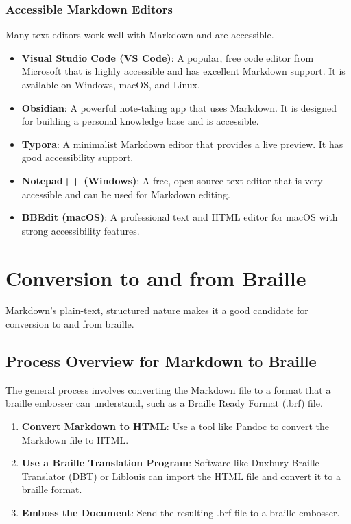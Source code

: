 \subsubsection{Accessible Markdown Editors}
\label{ssubsec:accessible-markdown-editors-details}
Many text editors work well with Markdown and are accessible.
\begin{itemize}
	\item \textbf{Visual Studio Code (VS Code)}: A popular, free code editor from Microsoft that is highly accessible and has excellent Markdown support. It is available on Windows, macOS, and Linux.
	\item \textbf{Obsidian}: A powerful note-taking app that uses Markdown. It is designed for building a personal knowledge base and is accessible.
	\item \textbf{Typora}: A minimalist Markdown editor that provides a live preview. It has good accessibility support.
	\item \textbf{Notepad++ (Windows)}: A free, open-source text editor that is very accessible and can be used for Markdown editing.
	\item \textbf{BBEdit (macOS)}: A professional text and HTML editor for macOS with strong accessibility features.
\end{itemize}

\section{Conversion to and from Braille}
\label{sec:markdown-braille-conversion}
Markdown's plain-text, structured nature makes it a good candidate for conversion to and from braille.

\subsection{Process Overview for Markdown to Braille}
\label{subsec:markdown-to-braille}
The general process involves converting the Markdown file to a format that a \gls{braille} embosser can understand, such as a \gls{Braille Ready Format} (.brf) file.
\begin{enumerate}
	\item \textbf{Convert Markdown to HTML}: Use a tool like Pandoc to convert the Markdown file to HTML.
	\item \textbf{Use a Braille Translation Program}: Software like Duxbury Braille Translator (DBT) or Liblouis can import the HTML file and convert it to a braille format.
	\item \textbf{Emboss the Document}: Send the resulting .brf file to a braille embosser.
\end{enumerate}

